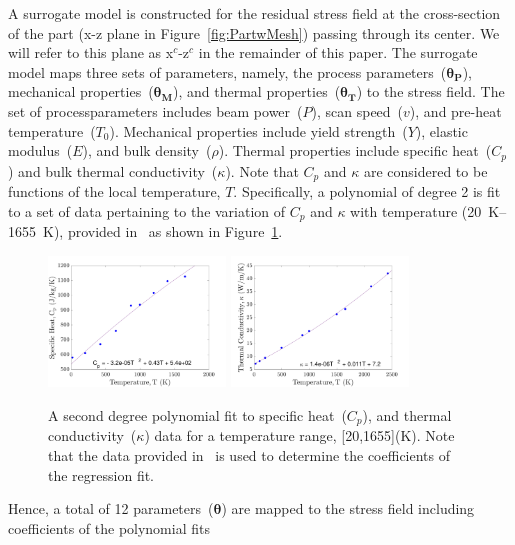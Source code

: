 A surrogate model is constructed for the residual stress field at the cross-section of the part 
(x-z plane in Figure~\ref{fig:PartwMesh}) passing through its center. We will refer to this plane
as x$^c$-z$^c$ in the remainder of this paper. The surrogate model maps three sets of
parameters, namely, the process parameters~($\bm{\theta_P}$), mechanical properties~($\bm{\theta_M}$),
and thermal properties~($\bm{\theta_T}$) to the stress field. The set of processparameters includes
beam power~($P$), scan speed~($v$), and pre-heat temperature~($T_0$). Mechanical properties
include yield strength~($Y$), elastic modulus~($E$), and bulk density~($\rho$). Thermal 
properties include specific heat~($C_p$) and bulk thermal conductivity~($\kappa$). Note that $C_p$ and $\kappa$
are considered to be functions of the local temperature, $T$. Specifically, a polynomial of degree 2 is fit
to a set of data pertaining to the variation of $C_p$ and $\kappa$ with temperature (20~K--1655~K), 
provided in~\cite{Fu:2014} as shown in Figure~\ref{fig:Cp_kappa}.
%
\begin{figure}[htbp]
\begin{center}
\includegraphics[width=0.42\textwidth]{./Figures/cp_fit}
\includegraphics[width=0.42\textwidth]{./Figures/kappa_fit}
\end{center}
\caption{A second degree polynomial fit to specific heat~($C_p$), and thermal conductivity~($\kappa$) data
for a temperature range, [20,1655](K). Note that the data provided in~\cite{Fu:2014} is used to determine
the coefficients of the regression fit.}
\label{fig:Cp_kappa}
\end{figure}
%
Hence, a total of 12 parameters~($\bm{\theta}$) are mapped to the stress field including coefficients of the polynomial fits

